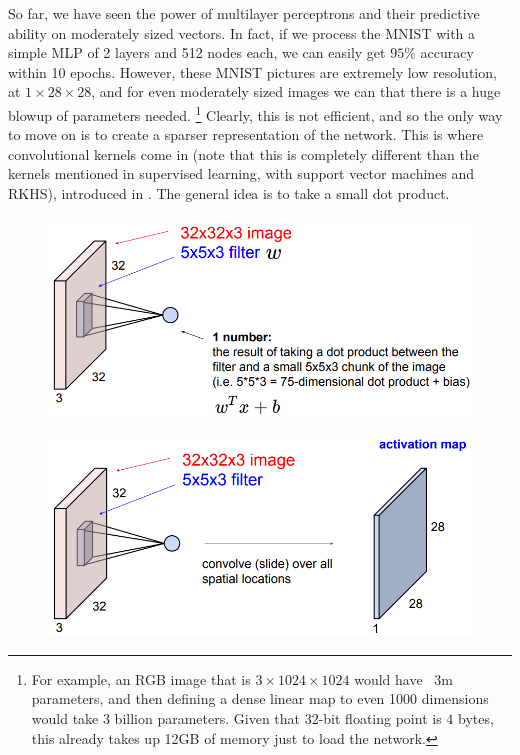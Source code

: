   So far, we have seen the power of multilayer perceptrons and their predictive ability on moderately sized vectors. In fact, if we process the MNIST with a simple MLP of 2 layers and 512 nodes each, we can easily get $95\%$ accuracy within 10 epochs. However, these MNIST pictures are extremely low resolution, at $1 \times 28 \times 28$, and for even moderately sized images we can that there is a huge blowup of parameters needed. \footnote{For example, an RGB image that is $3 \times 1024 \times 1024$ would have ~3m parameters, and then defining a dense linear map to even 1000 dimensions would take 3 billion parameters. Given that 32-bit floating point is $4$ bytes, this already takes up 12GB of memory just to load the network.} Clearly, this is not efficient, and so the only way to move on is to create a sparser representation of the network. This is where convolutional kernels come in (note that this is completely different than the kernels mentioned in supervised learning, with support vector machines and RKHS), introduced in \cite{Lecun1998ConvNets}. The general idea is to take a small dot product.

  \begin{figure}[H]
    \centering 
    \includegraphics[scale=0.35]{img/03_CNN/kernel1.png}
    \caption{} 
    \label{fig:kernel1}
  \end{figure}

  \begin{figure}[H]
    \centering 
    \includegraphics[scale=0.35]{img/03_CNN/kernel2.png}
    \caption{} 
    \label{fig:kernel2}
  \end{figure}

